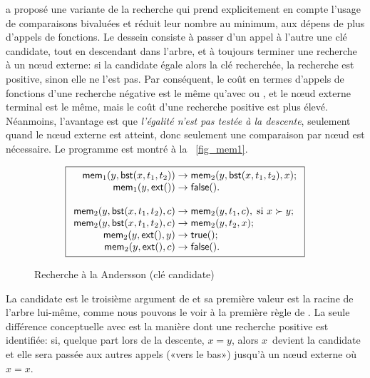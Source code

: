 
\cite{Andersson_1991} a proposé une variante de la recherche qui prend
explicitement en compte l'usage de comparaisons bivaluées et réduit
leur nombre au minimum, aux dépens de plus d'appels de fonctions. Le
dessein consiste à passer d'un appel à l'autre une clé candidate, tout
en descendant dans l'arbre, et à toujours terminer une recherche à un
n{\oe}ud externe: si la candidate égale alors la clé recherchée, la
recherche est positive, sinon elle ne l'est pas. Par conséquent, le
coût en termes d'appels de fonctions d'une recherche négative est le
même qu'avec  ou
, et le n{\oe}ud externe
terminal est le même, mais le coût d'une recherche positive est plus
élevé. Néanmoins, l'avantage est que \emph{l'égalité n'est pas testée
  à la descente}, seulement quand le n{\oe}ud externe est atteint,
donc seulement une comparaison par n{\oe}ud est nécessaire. Le
programme est montré à la \fig~\vref{fig_mem1}.
\begin{figure}
\begin{equation*}
\boxed{
\begin{array}{r@{\;}l@{\;}l}
\fun{mem}_1(y,\fun{bst}(x,t_1,t_2)) & \rightarrow &
  \fun{mem}_2(y,\fun{bst}(x,t_1,t_2),x);\\
\fun{mem}_1(y,\fun{ext}()) & \rightarrow & \fun{false}().\\
\\
\fun{mem}_2(y,\fun{bst}(x,t_1,t_2),c) & \rightarrow &
  \fun{mem}_2(y,t_1,c),\; \text{si \(x \succ y\)};\\
\fun{mem}_2(y,\fun{bst}(x,t_1,t_2),c) & \rightarrow &
  \fun{mem}_2(y,t_2,x);\\
\fun{mem}_2(y,\fun{ext}(),y) & \rightarrow & \fun{true}();\\
\fun{mem}_2(y,\fun{ext}(),c) & \rightarrow & \fun{false}().
\end{array}}
\end{equation*}
\caption{Recherche à la Andersson (clé candidate)\label{fig_mem1}}
\end{figure}
La candidate est le troisième argument de
 et sa première valeur
est la racine de l'arbre lui-même, comme nous pouvons le voir à la
première règle de . La
seule différence conceptuelle avec
 est la manière dont
une recherche positive est identifiée: si, quelque part lors de la
descente, \(x = y \), alors \(x\)~devient la candidate et elle sera
passée aux autres appels («vers le bas») jusqu'à un n{\oe}ud externe
où \(x = x\).


